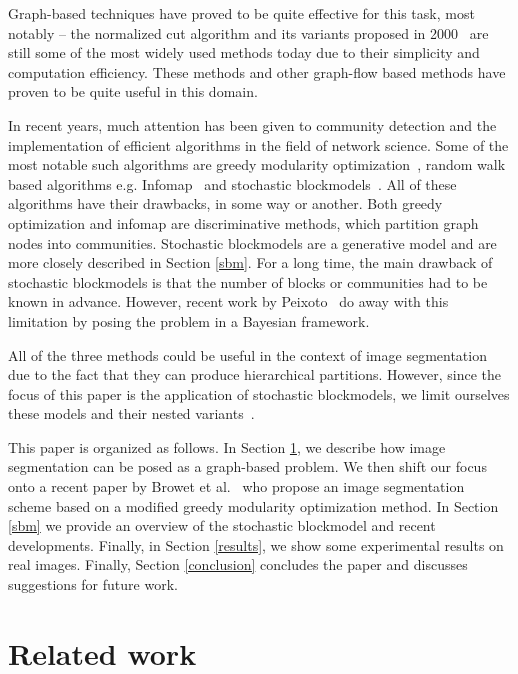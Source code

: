 \documentclass[conference]{IEEEtran}
\begin{document}
Graph-based techniques have proved to be quite effective for this task, most notably -- the normalized cut algorithm and its variants proposed in 2000~\cite{shi2000normalized} are still some of the most widely used methods today due to their simplicity and computation efficiency. These methods and other graph-flow based methods have proven to be quite useful in this domain.

In recent years, much attention has been given to community detection and the implementation of efficient algorithms in the field of network science. Some of the most notable such algorithms are greedy modularity optimization~\cite{clauset2004finding}, random walk based algorithms e.g. Infomap~\cite{rosvall2008maps} and stochastic blockmodels~\cite{holland1983stochastic}. All of these algorithms have their drawbacks, in some way or another.  Both greedy optimization and infomap are discriminative methods, which partition graph nodes into communities. Stochastic blockmodels are a generative model and are more closely described in Section \ref{sbm}. For a long time, the main drawback of stochastic blockmodels is that the number of blocks or communities had to be known in advance. However, recent work by Peixoto~\cite{peixoto2017nonparametric} do away with this limitation by posing the problem in a Bayesian framework.

All of the three methods could be useful in the context of image segmentation due to the fact that they can produce hierarchical partitions. However, since the focus of this paper is the application of stochastic blockmodels, we limit ourselves these models and their nested variants~\cite{peixoto2014hierarchical}.

This paper is organized as follows. In Section \ref{related_work}, we describe how image segmentation can be posed as a graph-based problem. We then shift our focus onto a recent paper by Browet et al.~\cite{browet2011community} who propose an image segmentation scheme based on a modified greedy modularity optimization method. In Section \ref{sbm} we provide an overview of the stochastic blockmodel and recent developments. Finally, in Section \ref{results}, we show some experimental results on real images. Finally, Section \ref{conclusion} concludes the paper and discusses suggestions for future work.


\section{Related work}\label{related_work}
\end{document}

